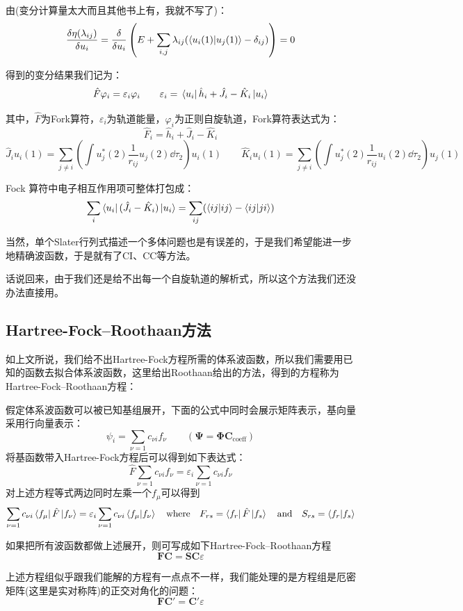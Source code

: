 由(变分计算量太大而且其他书上有，我就不写了)：
\[\frac{\delta\eta(\lambda_{ij})}{\delta u_i}=\frac{\delta}{\delta u_i}\left(E+\sum_{i,j}\lambda_{ij}(\bra{u_i(1)}\ket{u_j(1)}-\delta_{ij})\right)=0\]

得到的变分结果我们记为：
\[\hat{F}\varphi_i=\varepsilon_i\varphi_i \qquad \varepsilon_i=\bra*{u_i}\hat{h}_i+\hat{J}_i-\hat{K}_i\ket*{u_i}\]

其中，$\hat{F}$为Fork算符，$\varepsilon_i$为轨道能量，$\varphi_i$为正则自旋轨道，Fork算符表达式为：
\[\hat{F}_i = \hat{h}_i + \hat{J}_i - \hat{K}_i\]
\[\hat{J}_iu_i(1) = \sum_{j \neq i}\left(\int u_j^*(2)\frac{1}{r_{ij}}u_j(2)\dd{\tau}_2\right)u_i(1) \qquad \hat{K}_iu_i(1) = \sum_{j \neq i}\left(\int u_j^*(2)\frac{1}{r_{ij}}u_i(2)\dd{\tau}_2\right)u_j(1)\]

Fock 算符中电子相互作用项可整体打包成：
\[\sum_i\bra{u_i}(\hat{J}_i-\hat{K}_i)\ket{u_i}=\sum_{ij}(\bra{ij}\ket{ij}-\bra{ij}\ket{ji})\]

当然，单个Slater行列式描述一个多体问题也是有误差的，于是我们希望能进一步地精确波函数，于是就有了CI、CC等方法。

话说回来，由于我们还是给不出每一个自旋轨道的解析式，所以这个方法我们还没办法直接用。

\subsection{Hartree-Fock–Roothaan方法}
如上文所说，我们给不出Hartree-Fock方程所需的体系波函数，所以我们需要用已知的函数去拟合体系波函数，这里给出Roothaan给出的方法，得到的方程称为Hartree-Fock–Roothaan方程：

假定体系波函数可以被已知基组展开，下面的公式中同时会展示矩阵表示，基向量采用行向量表示：
\[\psi_i=\sum_{\nu=1}c_{\nu i}f_{\nu} \qquad (\mathbf{\Psi} = \mathbf{\Phi} \mathbf{C}_{\text{coeff}})\]
将基函数带入Hartree-Fock方程后可以得到如下表达式：
\[\hat{F}\sum_{\nu=1}c_{\nu i}f_{\nu}=\varepsilon_i\sum_{\nu=1}c_{\nu i}f_{\nu}\]
对上述方程等式两边同时左乘一个$f_{\mu}$可以得到
\[\sum_{\nu=1}c_{\nu i}\bra{f_{\mu}}\hat{F}\ket{f_{\nu}}=\varepsilon_i\sum_{\nu=1}c_{\nu i}\bra{f_{\mu}}\ket{f_{\nu}} \quad \text{where} \quad F_{rs}=\bra{f_r}\hat{F}\ket{f_s} \quad \text{and} \quad S_{rs}=\bra{f_r}\ket{f_s}\]

如果把所有波函数都做上述展开，则可写成如下Hartree-Fock–Roothaan方程
\[\mathbf{F}\mathbf{C}=\mathbf{S}\mathbf{C}\varepsilon\]

上述方程组似乎跟我们能解的方程有一点点不一样，我们能处理的是方程组是厄密矩阵(这里是实对称阵)的正交对角化的问题：
\[\mathbf{F}\mathbf{C}'=\mathbf{C}'\varepsilon\]

